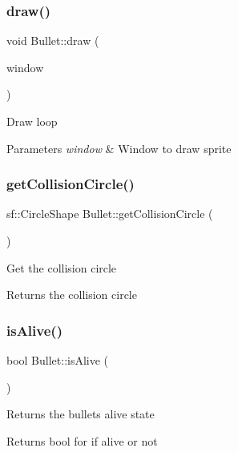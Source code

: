 \subsubsection{\texorpdfstring{draw()}{draw()}}
{\footnotesize\ttfamily void Bullet\+::draw (\begin{DoxyParamCaption}\item[{sf\+::\+Render\+Window \&}]{window }\end{DoxyParamCaption})}



Draw loop 


\begin{DoxyParams}{Parameters}
{\em window} & Window to draw sprite\\
\hline
\end{DoxyParams}
\mbox{\label{class_bullet_a62f499c863d9a0801a0ac7661e4bdf14}} 
\subsubsection{\texorpdfstring{getCollisionCircle()}{getCollisionCircle()}}
{\footnotesize\ttfamily sf\+::\+Circle\+Shape Bullet\+::get\+Collision\+Circle (\begin{DoxyParamCaption}{ }\end{DoxyParamCaption})}



Get the collision circle 

\begin{DoxyReturn}{Returns}
the collision circle
\end{DoxyReturn}
\mbox{\label{class_bullet_ae23f1f04ccd644d823184feb0da3c6b2}} 
\subsubsection{\texorpdfstring{isAlive()}{isAlive()}}
{\footnotesize\ttfamily bool Bullet\+::is\+Alive (\begin{DoxyParamCaption}{ }\end{DoxyParamCaption})}



Returns the bullets alive state 

\begin{DoxyReturn}{Returns}
bool for if alive or not
\end{DoxyReturn}
\mbox{\label{class_bullet_a502360f46d88c3640d022bffd5b99db5}} 
